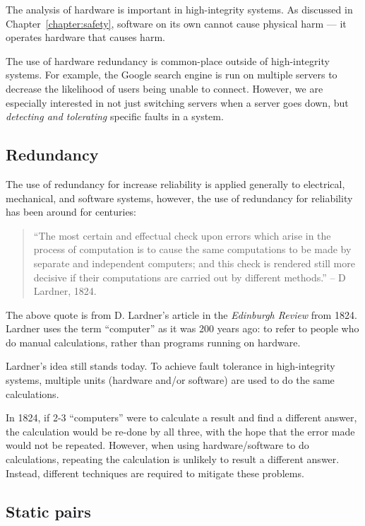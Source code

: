 The analysis of hardware is important in high-integrity systems. As discussed in Chapter~\ref{chapter:safety}, software on its own cannot cause physical harm --- it operates hardware that causes harm. 

The use of hardware redundancy is common-place outside of high-integrity systems. For example, the Google search engine is run on multiple servers to decrease the likelihood of users being unable to connect. However, we are especially interested in not just switching servers when a server goes down, but \emph{detecting and tolerating} specific faults in a system.



\subsection{Redundancy}


The use of redundancy for increase reliability is applied generally to electrical, mechanical, and software systems, however, the use of redundancy for reliability has been around for centuries:

\begin{quote}
``The most certain and effectual check upon errors which arise in the process of computation is to cause the same computations to be made by separate and independent computers; and this check is rendered still more decisive if their computations are carried out by different methods.'' -- D Lardner, 1824.
\end{quote}

The above quote is from D. Lardner's article in the {\em Edinburgh Review} from 1824. Lardner uses the term ``computer'' as it was 200 years ago: to refer to people who do manual calculations, rather than programs running on hardware.

Lardner's idea still stands today. To achieve fault tolerance in high-integrity systems, multiple units (hardware and/or software) are used to do the same calculations.

In 1824, if 2-3 ``computers'' were to calculate a result and find a different answer, the calculation would be re-done by all three, with the hope that the error made would not be repeated. However, when using hardware/software to do calculations, repeating the calculation is unlikely to result a different answer. Instead, different techniques are required to mitigate these problems.

\subsection{Static pairs}

